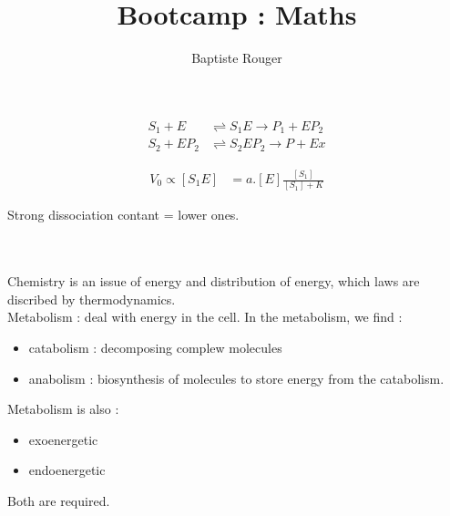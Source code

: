 \documentclass{article}
\title{Bootcamp : Maths}
\author{Baptiste Rouger}
\begin{document}
    \maketitle

    \tableofcontents

    \newpage

\begin{align*}
    S_1 + E &\rightleftharpoons  S_1E \rightarrow P_1 + EP_2 \\
    S_2 + EP_2 &\rightleftharpoons S_2EP_2 \rightarrow P + Ex
\end{align*}

\begin{align*}
    V_0 \propto [S_1E] &= a.[E]\frac{[S_1]}{[S_1]+K}
\end{align*}

Strong dissociation contant = lower ones.

~\\~\\

Chemistry is an issue of energy and distribution of energy, which laws are discribed by thermodynamics.\\

Metabolism : deal with energy in the cell. In the metabolism, we find :
\begin{itemize}
    \item catabolism : decomposing complew molecules
    \item anabolism : biosynthesis of molecules to store energy from the catabolism.
\end{itemize}

Metabolism is also :
\begin{itemize}
    \item exoenergetic
    \item endoenergetic
\end{itemize}
Both are required.
\end{document}
